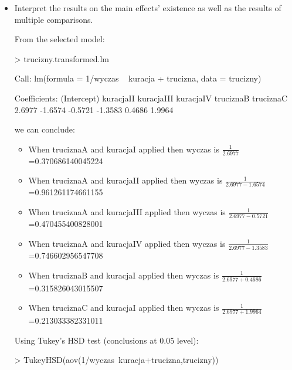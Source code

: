 \documentclass[a4paper]{article}
\begin{document}
\begin{itemize}
\item Interpret the results on the main effects' existence as well as the
results of multiple comparisons.

From the selected model:
\begin{Schunk}
\begin{Sinput}
> trucizny.transformed.lm	
\end{Sinput}
\begin{Soutput}
Call:
lm(formula = 1/wyczas ~ kuracja + trucizna, data = trucizny)

Coefficients:
(Intercept)    kuracjaII   kuracjaIII    kuracjaIV    truciznaB    truciznaC  
     2.6977      -1.6574      -0.5721      -1.3583       0.4686       1.9964  
\end{Soutput}
\end{Schunk}
we can conclude:
\begin{itemize}
  \item When truciznaA and  kuracjaI applied then wyczas is
  $\frac{1}{2.6977}$=0.370686140045224
  \item When truciznaA and  kuracjaII applied then wyczas is
  $\frac{1}{2.6977-1.6574}$=0.961261174661155
  \item When truciznaA and  kuracjaIII applied then wyczas is
  $\frac{1}{2.6977-0.5721}$=0.470455400828001
  \item When truciznaA and  kuracjaIV applied then wyczas is
  $\frac{1}{2.6977-1.3583}$=0.746602956547708
  \item When truciznaB and  kuracjaI applied then wyczas is
  $\frac{1}{2.6977+ 0.4686}$=0.315826043015507
  \item When truciznaC and  kuracjaI applied then wyczas is
  $\frac{1}{2.6977+ 1.9964}$=0.213033382331011
\end{itemize}

Using Tukey's HSD test (conclusions at 0.05 level):
\begin{Schunk}
\begin{Sinput}
> TukeyHSD(aov(1/wyczas~kuracja+trucizna,trucizny))	
\end{Sinput}
\end{Schunk}
\end{itemize}
\end{document}
